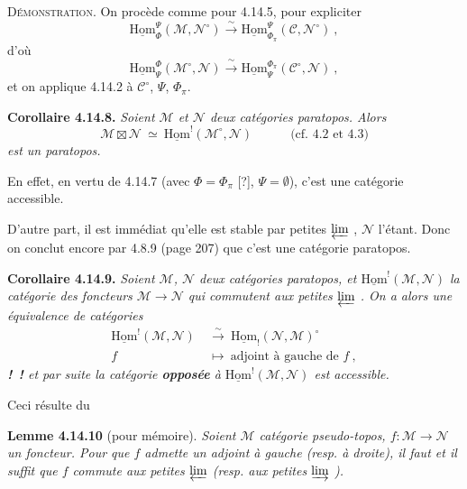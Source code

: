 \documentclass[11pt]{article}
\newcommand{\msp}[1]{\marginpar{\footnotesize [#1]}}
\newcommand{\uHom}{\underline{\mathrm{Hom}}}
\begin{document}
\noindent\textsc{Démonstration}. On procède comme pour 4.14.5, pour expliciter
\[
\uHom^{\Psi}_{\Phi}(\mathcal{M},\mathcal{N}^{\circ}) \xrightarrow{\ \sim\ } \uHom^{\Psi}_{\Phi_\pi}(\mathcal{C},\mathcal{N}^{\circ})\ ,
\]
d'où
\[
\uHom^{\Phi}_{\Psi}(\mathcal{M}^{\circ},\mathcal{N}) \xrightarrow{\ \sim\ } \uHom^{\Phi_\pi}_{\Psi}(\mathcal{C}^{\circ},\mathcal{N})\ ,
\]
et on applique 4.14.2 à $\mathcal{C}^{\circ}$, $\Psi$, $\Phi_\pi$.

\noindent\textbf{Corollaire 4.14.8.} {\itshape Soient $\mathcal{M}$ et $\mathcal{N}$ deux catégories paratopos. Alors
\[
\mathcal{M}\boxtimes\mathcal{N}\ \simeq\ \uHom^{!}(\mathcal{M}^{\circ},\mathcal{N}) \qquad\quad \text{(cf. 4.2 et 4.3)}
\]
est un paratopos.}

En effet, en vertu de 4.14.7 (avec $\Phi=\Phi_\pi$ [?], $\Psi=\emptyset$), c'est une catégorie accessible.

\msp{page 379}

D'autre part, il est immédiat qu'elle est stable par petites $\varprojlim$ , $\mathcal{N}$ l'étant. Donc on conclut encore par 4.8.9 (page 207) que c'est une catégorie paratopos.

\noindent\textbf{Corollaire 4.14.9.} {\itshape Soient $\mathcal{M}$, $\mathcal{N}$ deux catégories paratopos, et $\uHom^{!}(\mathcal{M},\mathcal{N})$ la catégorie des foncteurs $\mathcal{M}\longrightarrow\mathcal{N}$ qui commutent aux petites $\varprojlim$ . On a alors une équivalence de catégories
\[
\begin{aligned}
\uHom^{!}(\mathcal{M},\mathcal{N}) &\ \xrightarrow{\ \sim\ }\ \uHom_{!}(\mathcal{N},\mathcal{M})^{\circ}\\
f &\ \longmapsto\ \text{adjoint à gauche de } f\ ,
\end{aligned}
\]
\noindent\textup{\textbf{!}}\ \textup{\textbf{!}} et par suite la catégorie \textup{\textbf{opposée}} à $\uHom^{!}(\mathcal{M},\mathcal{N})$ est accessible.} %

Ceci résulte du

\noindent\textbf{Lemme 4.14.10} (pour mémoire). {\itshape Soient $\mathcal{M}$ catégorie pseudo-topos, $f:\mathcal{M}\longrightarrow\mathcal{N}$ un foncteur. Pour que $f$ admette un adjoint à gauche (resp. à droite), il faut et il suffit que $f$ commute aux petites $\varprojlim$ (resp. aux petites $\varinjlim$ ).}
\end{document}
